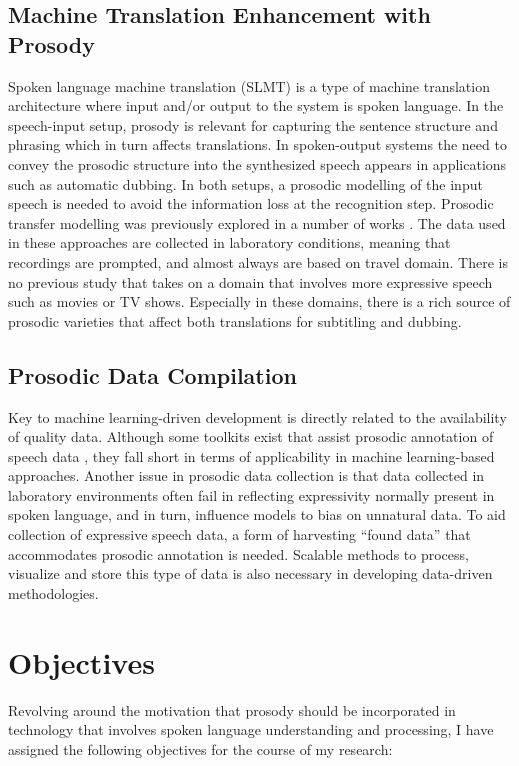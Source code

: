 \subsection{Machine Translation Enhancement with Prosody}
Spoken language machine translation (SLMT) is a type of machine translation architecture where input and/or output to the system is spoken language. In the speech-input setup, prosody is relevant for capturing the sentence structure and phrasing which in turn affects translations. In spoken-output systems the need to convey the prosodic structure into the synthesized speech appears in applications such as automatic dubbing. In both setups, a prosodic modelling of the input speech is needed to avoid the information loss at the recognition step. Prosodic transfer modelling was previously explored in a number of works \citep{aguero2006prosody, Quoc2018, anumanchipalli:2012}. The data used in these approaches are collected in laboratory conditions, meaning that recordings are prompted, and almost always are based on travel domain. There is no previous study that takes on a domain that involves more expressive speech such as movies or TV shows. Especially in these domains, there is a rich source of prosodic varieties that affect both translations for subtitling and dubbing. 

\subsection{Prosodic Data Compilation}
Key to machine learning-driven development is directly related to the availability of quality data. Although some toolkits exist that assist prosodic annotation of speech data \citep{Rosenberg10, ProsodyPro, L06-1340}, they fall short in terms of applicability in machine learning-based approaches. Another issue in prosodic data collection is that data collected in laboratory environments often fail in reflecting expressivity normally present in spoken language, and in turn, influence models to bias on unnatural data. To aid collection of expressive speech data, a form of harvesting ``found data'' that accommodates prosodic annotation is needed. Scalable methods to process, visualize and store this type of data is also necessary in developing data-driven methodologies.

\section{Objectives}
Revolving around the motivation that prosody should be incorporated in technology that involves spoken language understanding and processing, I have assigned the following objectives for the course of my research: 

